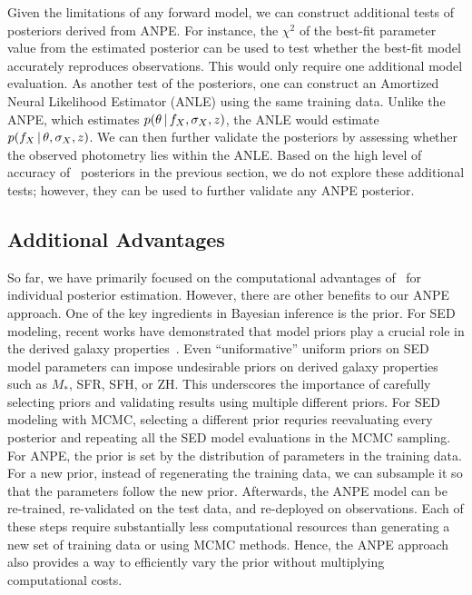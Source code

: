 Given the limitations of any forward model, we can construct additional tests
of posteriors derived from ANPE. 
For instance, the $\chi^2$ of the best-fit parameter value from the 
estimated posterior can be used to test whether the best-fit model 
accurately reproduces observations.
This would only require one additional model evaluation. 
As another test of the posteriors, one can construct an Amortized Neural
Likelihood Estimator (ANLE) using the same training data. 
Unlike the ANPE, which estimates $p(\theta\,|\, f_X, \sigma_X, z)$, the ANLE
would estimate $p(f_X \,|\, \theta, \sigma_X, z)$.
We can then further validate the posteriors by assessing whether the observed
photometry lies within the ANLE. 
Based on the high level of accuracy of \sedflow~posteriors in the previous
section, we do not explore these additional tests; however, they can be used to
further validate any ANPE posterior. 

\subsection{Additional Advantages} 
So far, we have primarily focused on the computational advantages of
\sedflow~for individual posterior estimation. 
However, there are other benefits to our ANPE approach. 
One of the key ingredients in Bayesian inference is the prior. 
For SED modeling, recent works have demonstrated that model priors play a
crucial role in the derived galaxy properties~\citep{carnall2018, leja2019,
hahn2022}. 
Even ``uniformative'' uniform priors on SED model parameters can impose
undesirable priors on derived galaxy properties such as $M_*$, SFR, SFH, or
ZH.
This underscores the importance of carefully selecting priors and validating
results using multiple different priors. 
For SED modeling with MCMC, selecting a different prior requries reevaluating
every posterior and repeating all the SED model evaluations in the MCMC
sampling.  
For ANPE, the prior is set by the distribution of parameters in the training
data. 
For a new prior, instead of regenerating the training data, we can subsample
it so that the parameters follow the new prior. 
Afterwards, the ANPE model can be re-trained, re-validated on the test data,
and re-deployed on observations.
Each of these steps require substantially less computational resources than
generating a new set of training data or using MCMC methods. 
Hence, the ANPE approach also provides a way to efficiently vary the prior
without multiplying computational costs. 


